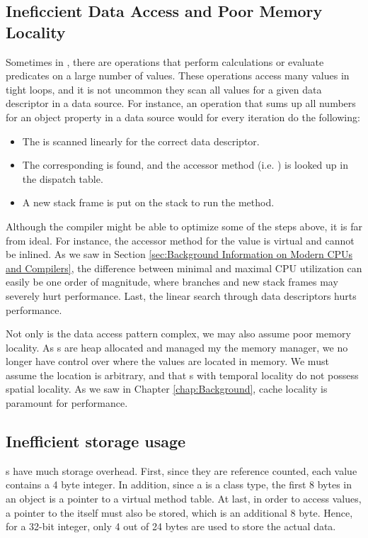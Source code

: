 \subsection{Ineficcient Data Access and Poor Memory Locality}
\label{sub:Ineficcient Data Access and Poor Memory Locality}
Sometimes in \gap, there are operations that perform calculations or evaluate predicates on a large number of values. These operations access many values in tight loops, and it is not uncommon they scan all values for a given data descriptor in a data source. For instance, an operation that sums up all numbers for an object property in a data source would for every iteration do the following:
\begin{itemize}
    \item The  is scanned linearly for the correct data descriptor.
    \item The corresponding  is found, and the accessor method (i.e. ) is looked up in the dispatch table.
    \item A new stack frame is put on the stack to run the  method.
\end{itemize}

Although the compiler might be able to optimize some of the steps above, it is far from ideal. For instance, the accessor method for the value is virtual and cannot be inlined. As we saw in Section \ref{sec:Background Information on Modern CPUs and Compilers}, the difference between minimal and maximal CPU utilization can easily be one order of magnitude, where branches and new stack frames may severely hurt performance. Last, the linear search through data descriptors hurts performance.

Not only is the data access pattern complex, we may also assume poor memory locality. As s are heap allocated and managed my the memory manager, we no longer have control over where the values are located in memory. We must assume the location is arbitrary, and that s with temporal locality do not possess spatial locality. As we saw in Chapter \ref{chap:Background}, cache locality is paramount for performance.

\subsection{Inefficient storage usage}
\label{sub:Inefficient storage usage}
s have much storage overhead. First, since they are reference counted, each value contains a 4 byte integer. In addition, since a  is a class type, the first 8 bytes in an object is a pointer to a virtual method table. At last, in order to access values, a pointer to the  itself must also be stored, which is an additional 8 byte. Hence, for a 32-bit integer, only 4 out of 24 bytes are used to store the actual data.

